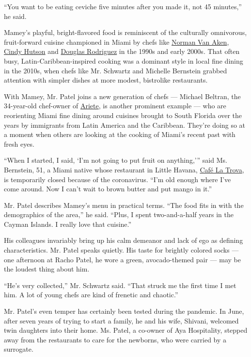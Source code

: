 ``You want to be eating ceviche five minutes after you made it, not 45
minutes,'' he said.

Mamey's playful, bright-flavored food is reminiscent of the culturally
omnivorous, fruit-forward cuisine championed in Miami by chefs like
\href{https://normanvanaken.com}{Norman Van Aken},
\href{https://www.miamiherald.com/miami-com/restaurants/article244354337.html}{Cindy
Hutson} and \href{https://chefdouglasrodriguez.com}{Douglas Rodriguez}
in the 1990s and early 2000s. That often busy, Latin-Caribbean-inspired
cooking was a dominant style in local fine dining in the 2010s, when
chefs like Mr. Schwartz and Michelle Bernstein grabbed attention with
simpler dishes at more modest, bistrolike restaurants.

With Mamey, Mr. Patel joins a new generation of chefs --- Michael
Beltran, the 34-year-old chef-owner of
\href{https://arietecoconutgrove.com/}{Ariete}, is another prominent
example --- who are reorienting Miami fine dining around cuisines
brought to South Florida over the years by immigrants from Latin America
and the Caribbean. They're doing so at a moment when others are looking
at the cooking of Miami's recent past with fresh eyes.

``When I started, I said, `I'm not going to put fruit on anything,'''
said Ms. Bernstein, 51, a Miami native whose restaurant in Little
Havana, \href{https://www.cafelatrova.com/}{Café La Trova}, is
temporarily closed because of the coronavirus. ``I'm old enough where
I've come around. Now I can't wait to brown butter and put mango in
it.''

Mr. Patel describes Mamey's menu in practical terms. ``The food fits in
with the demographics of the area,'' he said. ``Plus, I spent
two-and-a-half years in the Cayman Islands. I really love that
cuisine.''

His colleagues invariably bring up his calm demeanor and lack of ego as
defining characteristics. Mr. Patel speaks quietly. His taste for
brightly colored socks --- one afternoon at Racho Patel, he wore a
green, avocado-themed pair --- may be the loudest thing about him.

``He's very collected,'' Mr. Schwartz said. ``That struck me the first
time I met him. A lot of young chefs are kind of frenetic and chaotic.''

Mr. Patel's even temper has certainly been tested during the pandemic.
In June, after seven years of trying to start a family, he and his wife,
Shivani, welcomed twin daughters into their home. Ms. Patel, a co-owner
of Aya Hospitality, stepped away from the restaurants to care for the
newborns, who were carried by a surrogate.


